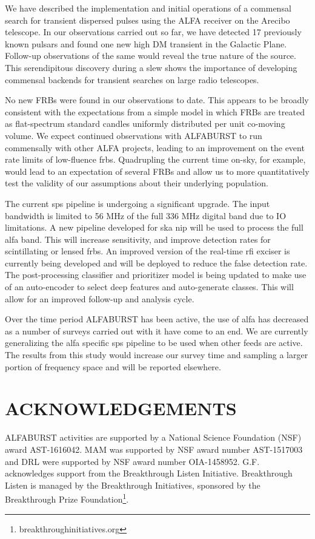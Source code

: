 \documentclass[a4paper,fleqn,usenatbib]{mnras}
\begin{document}
We have described the implementation and initial operations of a commensal
search for transient dispersed pulses using the ALFA receiver on the Arecibo
telescope. In our observations carried out so far, we have detected 17
previously known pulsars and found one new  high DM transient in the Galactic
Plane.  Follow-up observations of the same would reveal the true nature of the
source. This serendipitous discovery during a slew shows the importance of
developing commensal backends for transient searches on large radio telescopes.

No new FRBs were found in our observations to date. This appears to be broadly
consistent with the expectations from a simple model in which FRBs are treated
as flat-spectrum standard candles uniformly distributed per unit co-moving
volume. We expect continued observations with ALFABURST to run commensally with
other ALFA projects, leading to an improvement on the event rate limits of
low-fluence \glspl{frb}. Quadrupling the current time on-sky, for example,
would lead to an expectation of several FRBs and allow us to more
quantitatively test the validity of our assumptions about their underlying
population.

The current \gls{sps} pipeline is undergoing a significant upgrade. The input
bandwidth is limited to 56 MHz of the full 336 MHz digital band due to IO
limitations. A new pipeline developed for \gls{ska} \gls{nip} will be used to
process the full \gls{alfa} band.  This will increase sensitivity, and improve
detection rates for scintillating or lensed \glspl{frb}.  An improved version
of the real-time \gls{rfi} exciser is currently being developed and will be
deployed to reduce the false detection rate. The post-processing classifier and
prioritizer model is being updated to make use of an auto-encoder to select
deep features and auto-generate classes. This will allow for an improved
follow-up and analysis cycle.

Over the time period ALFABURST has been active, the use of \gls{alfa} has
decreased as a number of surveys carried out with it have come to an end. We
are currently generalizing the \gls{alfa} specific \gls{sps} pipeline to be
used when other feeds are active. The results from this study would increase
our survey time and sampling a larger portion of frequency space and will be
reported elsewhere. 

\section*{ACKNOWLEDGEMENTS}

ALFABURST activities are supported by a National Science Foundation (NSF) award
AST-1616042.  MAM was supported by NSF award number AST-1517003  and DRL were
supported by NSF award number OIA-1458952.  G.F. acknowledges support from the
Breakthrough Listen Initiative. Breakthrough Listen is managed by the
Breakthrough Initiatives, sponsored by the Breakthrough Prize
Foundation\footnote{breakthroughinitiatives.org}.


 

\bsp	%
\label{lastpage}
\end{document}
